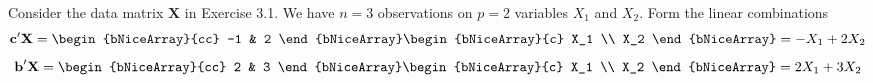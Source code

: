 Consider the data matrix $\textbf{X}$ in Exercise 3.1. 
We have $n = 3$ observations on $p = 2$ variables $X_1$ and $X_2$. 
Form the linear combinations
\[
    \textbf{c}^{\prime}\textbf{X}
    =
    \begin{bNiceArray}{cc}
        -1 & 2
    \end{bNiceArray}
    \begin{bNiceArray}{c}
        X_1 \\
        X_2
    \end{bNiceArray}
    =
    - X_1 + 2X_2
\]
\[
    \textbf{b}^{\prime}\textbf{X}
    =
    \begin{bNiceArray}{cc}
        2 & 3
    \end{bNiceArray}
    \begin{bNiceArray}{c}
        X_1 \\
        X_2
    \end{bNiceArray}
    =
    2X_1 + 3X_2
\]

